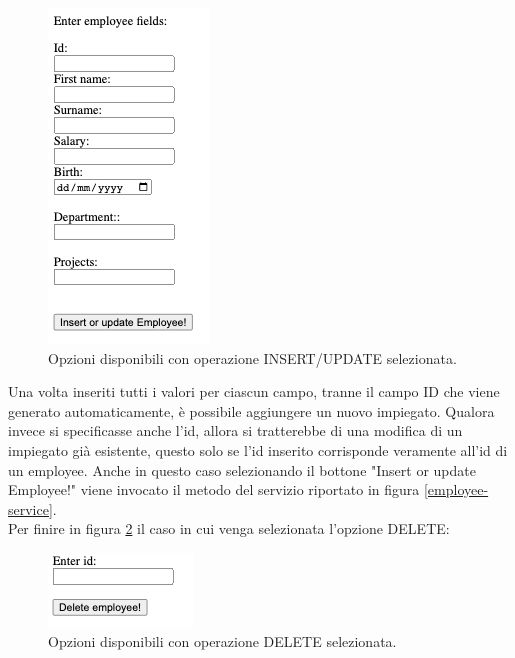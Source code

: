 \FloatBarrier
\begin{figure}[!ht]
\centering
\includegraphics[width=0.3\linewidth]{immagini/postEmployee.png}
\caption{Opzioni disponibili con operazione INSERT/UPDATE selezionata.}
\label{post-employee}
\end{figure}
\FloatBarrier
Una volta inseriti tutti i valori per ciascun campo, tranne il campo ID che viene generato automaticamente, è possibile aggiungere un nuovo impiegato. Qualora invece si specificasse anche l'id, allora si tratterebbe di una modifica di un impiegato già esistente, questo solo se l'id inserito corrisponde veramente all'id di un employee. Anche in questo caso selezionando il bottone "Insert or update Employee!" viene invocato il metodo del servizio riportato in figura \ref{employee-service}.\\
Per finire in figura \ref{delete-employee} il caso in cui venga selezionata l'opzione DELETE:
\FloatBarrier
\begin{figure}[!ht]
\centering
\includegraphics[width=0.3\linewidth]{immagini/deleteEmployee.png}
\caption{Opzioni disponibili con operazione DELETE selezionata.}
\label{delete-employee}
\end{figure}
\FloatBarrier
